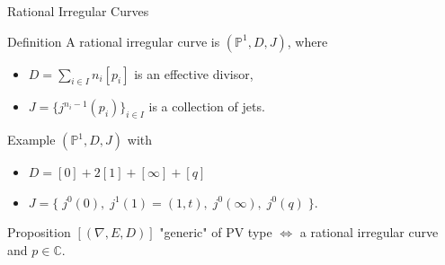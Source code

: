 \documentclass[10pt,xcolor=svgnames]{beamer} %
\newcommand{\C}{\mathbb{C}}
\renewcommand{\P}{\mathbb{P}}
\renewcommand{\O}{\mathscr{O}}
\newcommand{\1}{\mathbbm{1}}
\begin{document}
\begin{frame}{Rational Irregular Curves}
	\begin{exampleblock}{Definition}
		A rational irregular curve is $(\P^1, D, J)$, where 
		\begin{itemize}
			\item $D=\sum_{i\in I} n_i[p_i]$ is an effective divisor,
			\item $J=\{j^{n_i-1}(p_i)\}_{i\in I}$ is a collection of jets.
		\end{itemize}
	\end{exampleblock}
	\begin{exampleblock}{Example}
		$(\P^1, D, J)$ with 
		\begin{itemize}
			\item $D=[0]+2[1]+[\infty]+[q]$
			\item $J=\{\;j^0(0),\; j^1(1)=(1,t),\; j^0(\infty),\; j^0(q)\;\}$.
		\end{itemize}
	\end{exampleblock}
	\begin{exampleblock}{Proposition}
		$[(\nabla, E, D)]$ "generic" of PV type $\iff$ a rational irregular curve and $p\in\C$.
	\end{exampleblock}
\end{frame}




\end{document}
